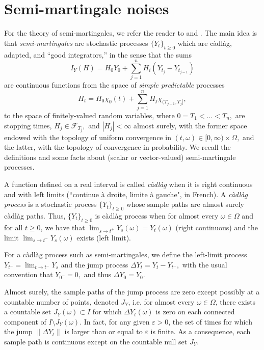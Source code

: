 \documentclass[reqno,12pt]{amsart}
\theoremstyle{plain} %
\theoremstyle{definition} %
\begin{document}
\section{Semi-martingale noises}
\label{secsemimartingale}

For the theory of semi-martingales, we refer the reader to \cite{Protter2005} and \cite{Metivier1982}. The main idea is that \emph{semi-martingales} are stochastic processes $\{Y_t\}_{t\geq 0}$ which are c\`adl\`ag, adapted, and ``good integrators,'' in the sense that the sums
\[
    I_Y(H) = H_0 Y_0 + \sum_{j=1}^n H_i(Y_{t_j}-Y_{t_{j-1}})
\]
are continuous functions from the space of \emph{simple predictable} processes
\[
    H_t = H_0 \chi_{0}(t) + \sum_{j=1}^n H_j \chi_{(T_{j-1}, T_j]},
\]
to the space of finitely-valued random variables, where $0=T_1 < \ldots < T_n,$ are stopping times, $H_j \in \mathcal{F}_{T_j},$ and $|H_j| < \infty$ almost surely, with the former space endowed with the topology of uniform convergence in $(t, \omega)\in [0,\infty)\times \Omega,$ and the latter, with the topology of convergence in probability. We recall the definitions and some facts about (scalar or vector-valued) semi-martingale processes.

A function defined on a real interval is called \emph{c\`adl\`ag} when it is right continuous and with left limits (``continue \`a droite, limite \`a gauche", in French). A \emph{c\`adl\`ag process} is a stochastic process $\{Y_t\}_{t\geq 0}$ whose sample paths are almost surely c\`adl\`ag paths. Thus, $\{Y_t\}_{t\geq 0}$ is c\`adl\`ag process when for almost every $\omega\in \Omega$ and for all $t\geq 0$, we have that $\lim_{s\rightarrow t^+} Y_s(\omega) = Y_t(\omega)$ (right continuous) and the limit $\lim_{s \rightarrow t^-} Y_s(\omega)$ exists (left limit).

For a c\`adl\`ag process such as semi-martingales, we define the left-limit process $Y_{t^{-}} = \lim_{t \rightarrow t^-} Y_s$ and the jump process $\Delta Y_t = Y_t - Y_{t^{-}},$ with the usual convention that $Y_{0^-} = 0,$ and thus $\Delta Y_0 = Y_0.$

Almost surely, the sample paths of the jump process are zero except possibly at a countable number of points, denoted $J_{Y}$, i.e. for almost every $\omega\in \Omega$, there exists a countable set $J_{Y}(\omega) \subset I$ for which $\Delta Y_t(\omega)$ is zero on each connected component of $I\setminus J_{Y}(\omega)$. In fact, for any given $\varepsilon > 0$, the set of times for which the jump $\|\Delta Y_t\|$ is larger than or equal to $\varepsilon$ is finite. As a consequence, each sample path is continuous except on the countable null set $J_{Y}.$
\end{document}
